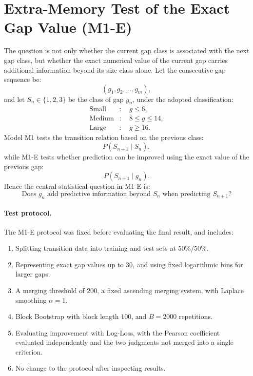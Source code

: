 \documentclass[12pt,a4paper]{article}
\begin{document}
\section{Extra-Memory Test of the Exact Gap Value (M1-E)}
The question is not only whether the current gap class is associated with the next gap class, but whether the exact numerical value of the current gap carries additional information beyond its size class alone.
Let the consecutive gap sequence be:
\[
(g_1,g_2,\ldots,g_m),
\]
and let \(S_n\in\{1,2,3\}\) be the class of gap \(g_n\), under the adopted classification:
\[
\begin{aligned}
\text{Small}&:\quad g\leq6,\\
\text{Medium}&:\quad 8\leq g\leq14,\\
\text{Large}&:\quad g\geq16.
\end{aligned}
\]
Model M1 tests the transition relation based on the previous class:
\[
P(S_{n+1}\mid S_n),
\]
while M1-E tests whether prediction can be improved using the exact value of the previous gap:
\[
P(S_{n+1}\mid g_n).
\]
Hence the central statistical question in M1-E is:
\[
\boxed{
\text{Does }g_n\text{ add predictive information beyond }
S_n\text{ when predicting }S_{n+1}?
}
\]
\paragraph{Test protocol.}
The M1-E protocol was fixed before evaluating the final result, and includes:
\begin{enumerate}
    \item Splitting transition data into training and test sets at \(50\%/50\%\).
    \item Representing exact gap values up to \(30\), and using fixed logarithmic bins for larger gaps.
    \item A merging threshold of \(200\), a fixed ascending merging system, with Laplace smoothing \(\alpha=1\).
    \item Block Bootstrap with block length \(100\), and \(B=2000\) repetitions.
    \item Evaluating improvement with Log-Loss, with the Pearson coefficient evaluated independently and the two judgments not merged into a single criterion.
    \item No change to the protocol after inspecting results.
\end{enumerate}
\end{document}
